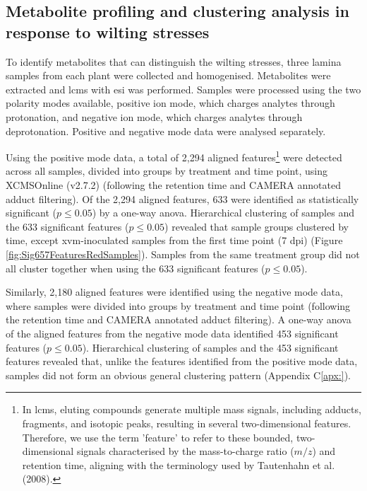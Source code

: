 \subsection{Metabolite profiling and clustering analysis in response to wilting stresses}

To identify metabolites that can distinguish the wilting stresses, three lamina samples from each plant were collected and homogenised. Metabolites were extracted and \ac{lcms} with \ac{esi} was performed. Samples were processed using the two polarity modes available, positive ion mode, which charges analytes through protonation, and negative ion mode, which charges analytes through deprotonation. Positive and negative mode data were analysed separately. 

Using the positive mode data, a total of 2,294 aligned features\footnote{In \ac{lcms}, eluting compounds generate multiple mass signals, including adducts, fragments, and isotopic peaks, resulting in several two-dimensional features. Therefore, we use the term 'feature' to refer to these bounded, two-dimensional signals characterised by the mass-to-charge ratio ($m/z$) and retention time, aligning with the terminology used by Tautenhahn et al. (2008).} were detected across all samples, divided into groups by treatment and time point, using XCMSOnline (v2.7.2) \parencite{Gowda2014} (following the retention time and CAMERA annotated adduct filtering). Of the 2,294 aligned features, 633 were identified as statistically significant ($p \le0.05$) by a one-way \ac{anova}. Hierarchical clustering of samples and the 633 significant features ($p \le0.05$) revealed that sample groups clustered by time, except \ac{xvm}-inoculated samples from the first time point (7 \ac{dpi}) (Figure \ref{fig:Sig657FeaturesRedSamples}). Samples from the same treatment group did not all cluster together when using the 633 significant features ($p \le0.05$).

Similarly, 2,180 aligned features were identified using the negative mode data, where samples were divided into groups by treatment and time point (following the retention time and CAMERA annotated adduct filtering). A one-way \ac{anova} of 
the aligned features from the negative mode data identified 453 significant features ($p \le0.05$). Hierarchical clustering of samples and the 453 significant features revealed that, unlike the features identified from the positive mode data, samples did not form an obvious general clustering pattern (Appendix C\ref{apx:}). 
 
